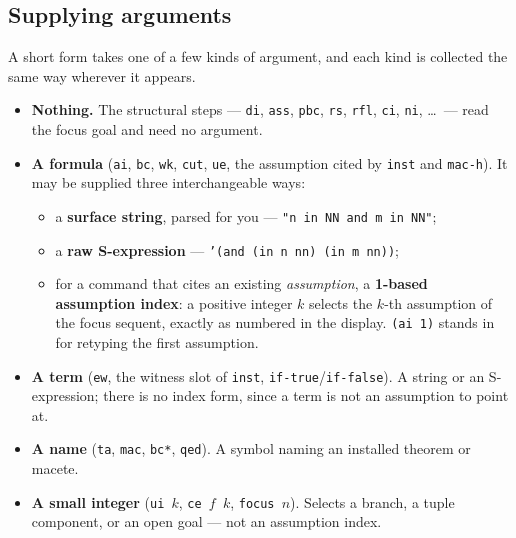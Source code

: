 \subsection{Supplying arguments}
\label{sec:arg-collection}

A short form takes one of a few kinds of argument, and each kind is
collected the same way wherever it appears.

\begin{itemize}
\item \textbf{Nothing.}  The structural steps --- \texttt{di}, \texttt{ass},
  \texttt{pbc}, \texttt{rs}, \texttt{rfl}, \texttt{ci}, \texttt{ni},
  \ldots\ --- read the focus goal and need no argument.

\item \textbf{A formula} (\texttt{ai}, \texttt{bc}, \texttt{wk},
  \texttt{cut}, \texttt{ue}, the assumption cited by \texttt{inst} and
  \texttt{mac-h}).  It may be supplied three interchangeable ways:
  \begin{itemize}
  \item a \textbf{surface string}, parsed for you ---
    \texttt{"n in NN and m in NN"};
  \item a \textbf{raw S-expression} ---
    \texttt{'(and (in n nn) (in m nn))};
  \item for a command that cites an existing \emph{assumption}, a
    \textbf{1-based assumption index}: a positive integer $k$ selects the
    $k$-th assumption of the focus sequent, exactly as numbered in the
    display.  \texttt{(ai 1)} stands in for retyping the first assumption.
  \end{itemize}

\item \textbf{A term} (\texttt{ew}, the witness slot of \texttt{inst},
  \texttt{if-true}/\texttt{if-false}).  A string or an S-expression; there
  is no index form, since a term is not an assumption to point at.

\item \textbf{A name} (\texttt{ta}, \texttt{mac}, \texttt{bc*},
  \texttt{qed}).  A symbol naming an installed theorem or macete.

\item \textbf{A small integer} (\texttt{ui $k$}, \texttt{ce $f$ $k$},
  \texttt{focus $n$}).  Selects a branch, a tuple component, or an open
  goal --- not an assumption index.
\end{itemize}


